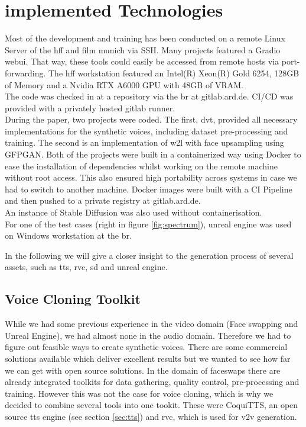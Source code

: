 \documentclass[
  a4paper,  %
  twoside,  %
  bibliography=totoc,
  headsepline,
  cleardoublepage=empty,
  parskip=half,
  draft=false
]{scrbook}
\begin{document}
\section{implemented Technologies}
\label{implementation}
Most of the development and training has been conducted on a remote Linux Server of the \gls{hff} and film munich via SSH. Many projects featured a Gradio webui. That way, these tools could easily be accessed from remote hosts via port-forwarding. The \gls{hff} workstation featured an Intel(R) Xeon(R) Gold 6254, 128GB of Memory and a Nvidia RTX A6000 GPU with 48GB of VRAM. \\
The code was checked in at a repository via the \gls{br} at gitlab.ard.de. CI/CD was provided with a privately hosted gitlab runner. \\
During the paper, two projects were coded. The first, \gls{dvt}, provided all necessary implementations for the synthetic voices, including dataset pre-processing and training. The second is an implementation of \gls{w2l} with face upsampling using GFPGAN. Both of the projects were built in a containerized way using Docker to ease the installation of dependencies whilst working on the remote machine without root access. This also ensured high portability across systems in case we had to switch to another machine. Docker images were built with a CI Pipeline and then pushed to a private registry at gitlab.ard.de. \\
An instance of Stable Diffusion was also used without containerisation.  \\
For one of the test cases (right in figure \ref{fig:spectrum}), unreal engine was used on Windows workstation at the \gls{br}.

In the following we will give a closer insight to the generation process of several assets, such as \gls{tts}, \gls{rvc}, \gls{sd} and unreal engine.

\subsection{Voice Cloning Toolkit}
\label{sec:dvt}
While we had some previous experience in the video domain (Face swapping and Unreal Engine), we had almost none in the audio domain. Therefore we had to figure out feasible ways to create synthetic voices. There are some commercial solutions available which deliver excellent results but we wanted to see how far we can get with open source solutions. In the domain of faceswaps there are already integrated toolkits for data gathering, quality control, pre-processing and training. However this was not the case for voice cloning, which is why we decided to combine several tools into one tookit. These were CoquiTTS, an open source \gls{tts} engine (see section \ref{sec:tts}) and \gls{rvc}, which is used for \gls{v2v} generation. 
\end{document}

